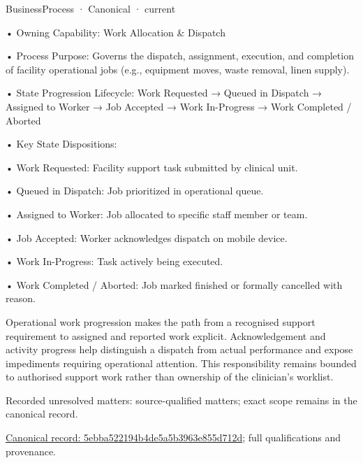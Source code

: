\label{element:5ebba522194b4de5a5b3963e855d712d}
{\small BusinessProcess · Canonical · current}\par

•
Owning Capability: Work Allocation \& Dispatch



•
Process Purpose: Governs the dispatch, assignment, execution, and completion of facility operational jobs (e.g., equipment moves, waste removal, linen supply).



•
State Progression Lifecycle: Work Requested → Queued in Dispatch → Assigned to Worker → Job Accepted → Work In-Progress → Work Completed / Aborted



•
Key State Dispositions:



•
Work Requested: Facility support task submitted by clinical unit.



•
Queued in Dispatch: Job prioritized in operational queue.



•
Assigned to Worker: Job allocated to specific staff member or team.



•
Job Accepted: Worker acknowledges dispatch on mobile device.



•
Work In-Progress: Task actively being executed.



•
Work Completed / Aborted: Job marked finished or formally cancelled with reason.



Operational work progression makes the path from a recognised support requirement to assigned and reported work explicit. Acknowledgement and activity progress help distinguish a dispatch from actual performance and expose impediments requiring operational attention. This responsibility remains bounded to authorised support work rather than ownership of the clinician's worklist.


{\small Recorded unresolved matters: source-qualified matters; exact scope remains in the canonical record.}\par
{\footnotesize \href{../../../../../../../../continuum/business/business-process/5ebba522194b4de5a5b3963e855d712d.md}{Canonical record: 5ebba522194b4de5a5b3963e855d712d}; full qualifications and provenance.}\par
